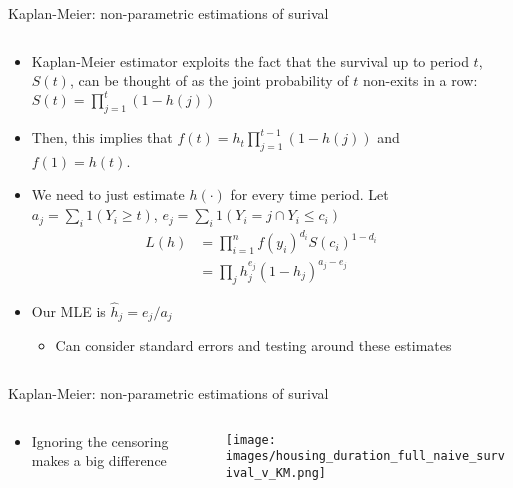 \documentclass[notes,11pt, aspectratio=169]{beamer}
\begin{document}
\begin{frame}{Kaplan-Meier: non-parametric estimations of surival}
  \begin{columns}[T] %
    \begin{column}{.8\textwidth}
      \begin{itemize}
      \item Kaplan-Meier estimator exploits the fact that the survival
        up to period $t$, $S(t)$, can be thought of as the joint
        probability of $t$ non-exits in a row:
        $S(t) = \prod_{j = 1}^{t}(1-h(j))$
      \item Then, this implies that
        $f(t) = h_{t}\prod_{j = 1}^{t-1}(1-h(j))$ and $f(1) = h(t)$.
      \item We need to just estimate $h(\cdot)$ for every time period.
        Let $a_{j} = \sum_{i} 1(Y_{i} \geq t) $,
        $e_{j} = \sum_{i} 1(Y_{i} = j \cap Y_{i} \leq c_{i})$
      \begin{align*}
        L(h) &= \prod_{i=1}^{n} f(y_{i})^{d_{i}}S(c_{i})^{1-d_{i}} \\
             &= \prod_{j} h_{j}^{e_{j}}(1-h_{j})^{a_{j}-e_{j}}
      \end{align*}
    \item Our MLE is $\hat{h}_{j} = e_{j}/a_{j}$
      \begin{itemize}
      \item Can consider standard errors and testing around these
        estimates
      \end{itemize}
  \end{itemize}
    \end{column}%
  \hfill%
  \begin{column}{.2\textwidth}
  \end{column}
\end{columns}
\end{frame}

\begin{frame}{Kaplan-Meier: non-parametric estimations of surival}
  \begin{columns}[T] %
    \begin{column}{0.3\textwidth}
      \begin{itemize}
      \item Ignoring the censoring makes a big difference  
      \end{itemize}
    \end{column}%
  \hfill%
  \begin{column}{.7\textwidth}
    \texttt{[image: images/housing\_duration\_full\_naive\_survival\_v\_KM.png]}
  \end{column}
\end{columns}
\end{frame}
\end{document}

